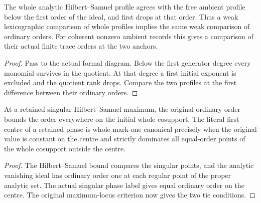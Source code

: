 \begin{theorem}
\label{hir:g8-initial-hs-ordinary-order}
\leanok
The whole analytic Hilbert--Samuel profile agrees with the
free ambient profile below the first order of the ideal,
and first drops at that order. Thus a weak lexicographic
comparison of whole profiles implies the same weak
comparison of ordinary orders. For coherent nonzero
ambient records this gives a comparison of their actual
finite trace orders at the two anchors.
\end{theorem}
\begin{proof}
Pass to the actual formal diagram. Below the first
generator degree every monomial survives in the quotient.
At that degree a first initial exponent is excluded and
the quotient rank drops. Compare the two profiles at the
first difference between their ordinary orders.
\end{proof}

\begin{theorem}
\label{hir:g8-initial-native-original-ties}
\leanok
At a retained singular Hilbert--Samuel maximum, the original
ordinary order bounds the order everywhere on the initial whole
cosupport. The literal first centre of a retained phase is whole
mark-one canonical precisely when the original value is constant
on the centre and strictly dominates all equal-order points of
the whole cosupport outside the centre.
\end{theorem}
\begin{proof}
The Hilbert--Samuel bound compares the singular points, and
the analytic vanishing ideal has ordinary order one at each
regular point of the proper analytic set. The actual singular
phase label gives equal ordinary order on the centre. The
original maximum-locus criterion now gives the two tie conditions.
\end{proof}

